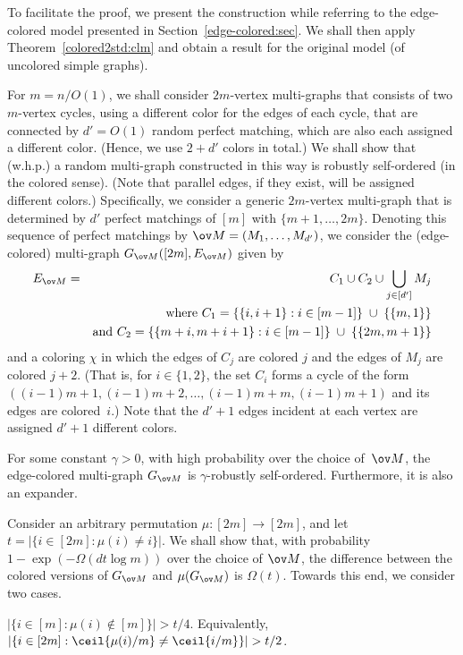\BPF
To facilitate the proof, we present the construction
while referring to the edge-colored model presented in
Section~\ref{edge-colored:sec}.
We shall then apply Theorem~\ref{colored2std:clm}
and obtain a result for the original model
(of uncolored simple graphs).

For $m=n/O(1)$,
we shall consider $2m$-vertex multi-graphs
that consists of two $m$-vertex cycles,
using a different color for the edges of each cycle,
that are connected by $d'=O(1)$ random perfect matching,
which are also each assigned a different color.
(Hence, we use $2+d'$ colors in total.)
We shall show that (w.h.p.) a random multi-graph constructed in this way
is robustly self-ordered (in the colored sense).
(Note that parallel edges, if they exist,
will be assigned different colors.)
%
Specifically,
we consider a generic $2m$-vertex multi-graph that is determined
by $d'$ perfect matchings of $[m]$ with $\{m+1,\ldots,2m\}$.
Denoting this sequence of perfect matchings by ${\ov M}=(M_1,\ldots,M_{d'})$,
we consider the (edge-colored) multi-graph $G_{\ov M}([2m],E_{\ov M})$
given by
\begin{eqnarray*}
E_{\ov M} &=& C_1\cup C_2 \cup\bigcup_{j\in[d']} M_j \\
& &\mbox{\rm where $C_1=\{\{i,i+1\}:i\in[m-1]\}\;\cup\;\{\{m,1\}\}$} \\
& &\mbox{\rm and $C_2=\{\{m+i,m+i+1\}:i\in[m-1]\}\;\cup\;\{\{2m,m+1\}\}$}
\end{eqnarray*}
and a coloring $\chi$ in which the edges of $C_j$ are colored $j$
and the edges of $M_j$ are colored $j+2$.
(That is, for $i\in\{1,2\}$, the set $C_i$ forms a cycle
of the form $((i-1)m+1,(i-1)m+2,\ldots,\allowbreak(i-1)m+m,(i-1)m+1)$
and its edges are colored~$i$.)
Note that the $d'+1$ edges incident at each vertex are assigned $d'+1$
different colors.

\label{random-colored:clm}
For some constant $\gamma>0$,
with high probability over the choice of~$\ov M$,
the edge-colored multi-graph $G_{\ov M}$ is $\gamma$-robustly self-ordered.
Furthermore, it is also an expander.
\Ecm

\Bpf
%
%
Consider an arbitrary permutation $\mu:[2m]\to[2m]$,
and let $t=|\{i\!\in\![2m]\!:\!\mu(i)\neq i\}|$.
%
%
We shall show that, with probability $1-\exp(-\Omega(dt\log m))$
over the choice of $\ov M$, the difference between the colored versions
of $G_{\ov M}$ and $\mu(G_{\ov M})$ is $\Omega(t)$.
Towards this end, we consider two cases.
\BDes
\item[{\em Case 1}:] $|\{i\in[m]:\mu(i)\not\in[m]\}|>t/4$.
Equivalently, $|\{i\in[2m]:\ceil{\mu(i)/m}\neq\ceil{i/m}\}|>t/2$.

